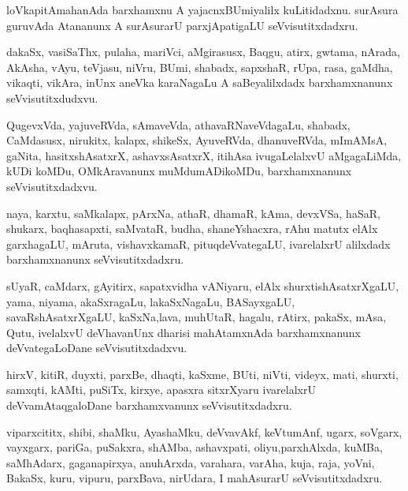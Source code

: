 \documentclass{article}
\begin{document}
\begin{mn}
loVkapitAmahanAda  barxhamxnu  A  yajacnxBUmiyalilx  kuLitidadxnu.  surAsura  guruvAda  
Atananunx  A  surAsurarU  parxjApatigaLU  seVvisutitxdadxru.
\end{mn}

\begin{mn}
dakaSx,  vasiSaThx,  pulaha,  mariVci,  aMgirasusx,  Baqgu,  atirx,  gwtama,  nArada,  
AkAsha,  vAyu,  teVjasu,  niVru,  BUmi,  shabadx,  sapxshaR,  rUpa,  rasa,  gaMdha,  
vikaqti,  vikAra,  inUnx  aneVka  karaNagaLu  A  saBeyalilxdadx  barxhamxnanunx  seVvisutitxdudxvu.
\end{mn}

\begin{mn}
QugevxVda,  yajuveRVda, sAmaveVda,  athavaRNaveVdagaLu,  shabadx,  CaMdasusx,  nirukitx,  kalapx, 
shikeSx, AyuveRVda, dhanuveRVda,  mImAMsA,  gaNita,  hasitxshAsatxrX,  ashavxsAsatxrX,  itihAsa  
ivugaLelalxvU  aMgagaLiMda,  kUDi koMDu,  OMkAravanunx  muMdumADikoMDu,  barxhamxnanunx  seVvisutitxdadxvu. 
\end{mn}

\begin{mn}
naya,  karxtu,  saMkalapx, pArxNa, athaR,  dhamaR,  kAma,  devxVSa,  haSaR,  shukarx,  
baqhasapxti,  saMvataR,  budha,  shaneYshacxra,  rAhu  matutx  elAlx  garxhagaLU,  mAruta,  
vishavxkamaR,  pituqdeVvategaLU,  ivarelalxrU  alilxdadx  barxhamxnanunx  seVvisutitxdadxru.
\end{mn}

\begin{mn}
sUyaR,  caMdarx,  gAyitirx,  sapatxvidha  vANiyaru,  elAlx  shurxtishAsatxrXgaLU,  yama,  niyama,  akaSxragaLu,  
lakaSxNagaLu,  BASayxgaLU,  savaRshAsatxrXgaLU,  kaSxNa,lava,  muhUtaR,  hagalu,  rAtirx,  pakaSx,  mAsa,  Qutu,  
ivelalxvU  deVhavanUnx  dharisi  mahAtamxnAda  barxhamxnanunx  deVvategaLoDane  seVvisutitxdadxvu.
\end{mn}

\begin{mn}
hirxV,  kitiR,  duyxti,  parxBe,  dhaqti,  kaSxme,  BUti,  niVti,  videyx,  mati,  
shurxti,  samxqti,  kAMti,  puSiTx,  kirxye,  apasxra  sitxrXyaru  ivarelalxrU  
deVvamAtaqgaloDane  barxhamxvanunx  seVvisutitxdadxru. 
\end{mn}

\begin{mn}
viparxcititx,  shibi, shaMku,  AyashaMku,  deVvavAkf,  keVtumAnf,  ugarx,  soVgarx, vayxgarx,  
pariGa,  puSakxra,  shAMba,  ashavxpati,  oliyu,parxhAlxda,  kuMBa,  saMhAdarx,  
gaganapirxya,  anuhArxda,  varahara,  varAha,  kuja,  raja,  yoVni,  BakaSx,  kuru,  
vipuru,  parxBava,  nirUdara,  I mahAsurarU  seVvisutitxdadxru.
\end{mn}
\end{document}
